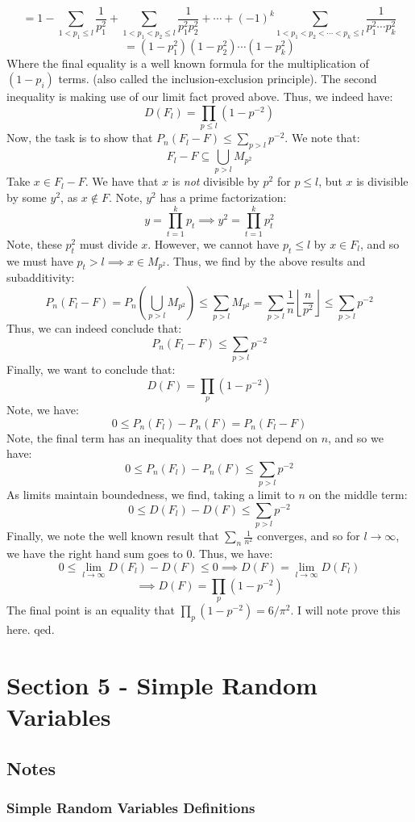 \documentclass[12pt,a4paper]{article}
\newcommand{\1}[1]{\mathbbm{1}\left\{ #1 \right\}}
\newcommand{\floor}[1]{\left\lfloor #1 \right\rfloor}
\begin{document}
$$
	=
	1 -
	\sum_{1 < p_1 \leq l} \frac{1}{p_1^2} +
	\sum_{1 < p_1 < p_2 \leq l} \frac{1}{p_1^2p_2^2} + \cdots +
	(-1)^k \sum_{1 < p_1 < p_2 < \cdots < p_k \leq l} \frac{1}{p_1^2 \cdots p_k^2}
$$
$$
	= (1-p_1^2)(1-p_2^2) \cdots (1-p_k^2)
$$
Where the final equality is a well known formula for the multiplication of $(1-p_i)$ terms. (also called the inclusion-exclusion principle). The second inequality is making use of our limit fact proved above. Thus, we indeed have:
$$
	D(F_l) = \prod_{p \leq l}(1 - p^{-2})
$$
Now, the task is to show that $P_n(F_l - F) \leq \sum_{p > l} p^{-2}$. We note that:
$$
	F_l - F \subseteq \bigcup_{p > l} M_{p^2}
$$
Take $x \in F_l - F$. We have that $x$ is \textit{not} divisible by $p^2$ for $p \leq l$, but $x$ is divisible by some $y^2$, as $x \not\in F$. Note, $y^2$ has a prime factorization:
$$
	y = \prod_{t=1}^k p_t \implies
	y^2 = \prod_{t=1}^k p_t^2
$$
Note, these $p_t^2$ must divide $x$. However, we cannot have $p_t \leq l$ by $x \in F_l$, and so we must have $p_t > l \implies x \in M_{p^2}$. Thus, we find by the above results and subadditivity:
$$
	P_n(F_l - F) = P_n\left(\bigcup_{p > l} M_{p^2}\right) \leq
	\sum_{p > l} M_{p^2} = \sum_{p > l} \frac{1}{n}\floor{\frac{n}{p^2}} \leq
	\sum_{p > l} p^{-2}
$$
Thus, we can indeed conclude that:
$$
	P_n(F_l - F) \leq \sum_{p > l} p^{-2}
$$
Finally, we want to conclude that:
$$
	D(F) = \prod_p (1 - p^{-2})
$$
Note, we have:
$$
	0 \leq P_n(F_l) - P_n(F) = P_n(F_l - F)
$$
Note, the final term has an inequality that does not depend on $n$, and so we have:
$$
	0 \leq P_n(F_l) - P_n(F) \leq \sum_{p > l} p^{-2}
$$
As limits maintain boundedness, we find, taking a limit to $n$ on the middle term:
$$
	0 \leq D(F_l) - D(F) \leq \sum_{p > l} p^{-2}
$$
Finally, we note the well known result that $\sum_n \frac{1}{n^2}$ converges, and so for $l \to \infty$, we have the right hand sum goes to $0$. Thus, we have:
$$
	0 \leq \lim_{l \to \infty} D(F_l) - D(F) \leq 0 \implies
	D(F) = \lim_{l \to \infty} D(F_l)
$$
$$
	\implies
	D(F) = \prod_p (1 - p^{-2})
$$
The final point is an equality that $\prod_p (1 - p^{-2}) = 6/\pi^2$. I will note prove this here. qed.

\section{Section 5 - Simple Random Variables}
\subsection{Notes}
\subsubsection{Simple Random Variables Definitions}
\end{document}
